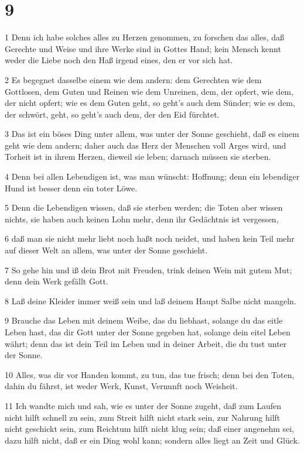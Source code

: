 \chapter{9}

\par 1 Denn ich habe solches alles zu Herzen genommen, zu forschen das alles, daß Gerechte und Weise und ihre Werke sind in Gottes Hand; kein Mensch kennt weder die Liebe noch den Haß irgend eines, den er vor sich hat.
\par 2 Es begegnet dasselbe einem wie dem andern: dem Gerechten wie dem Gottlosen, dem Guten und Reinen wie dem Unreinen, dem, der opfert, wie dem, der nicht opfert; wie es dem Guten geht, so geht's auch dem Sünder; wie es dem, der schwört, geht, so geht's auch dem, der den Eid fürchtet.
\par 3 Das ist ein böses Ding unter allem, was unter der Sonne geschieht, daß es einem geht wie dem andern; daher auch das Herz der Menschen voll Arges wird, und Torheit ist in ihrem Herzen, dieweil sie leben; darnach müssen sie sterben.
\par 4 Denn bei allen Lebendigen ist, was man wünscht: Hoffnung; denn ein lebendiger Hund ist besser denn ein toter Löwe.
\par 5 Denn die Lebendigen wissen, daß sie sterben werden; die Toten aber wissen nichts, sie haben auch keinen Lohn mehr, denn ihr Gedächtnis ist vergessen,
\par 6 daß man sie nicht mehr liebt noch haßt noch neidet, und haben kein Teil mehr auf dieser Welt an allem, was unter der Sonne geschieht.
\par 7 So gehe hin und iß dein Brot mit Freuden, trink deinen Wein mit gutem Mut; denn dein Werk gefällt Gott.
\par 8 Laß deine Kleider immer weiß sein und laß deinem Haupt Salbe nicht mangeln.
\par 9 Brauche das Leben mit deinem Weibe, das du liebhast, solange du das eitle Leben hast, das dir Gott unter der Sonne gegeben hat, solange dein eitel Leben währt; denn das ist dein Teil im Leben und in deiner Arbeit, die du tust unter der Sonne.
\par 10 Alles, was dir vor Handen kommt, zu tun, das tue frisch; denn bei den Toten, dahin du fährst, ist weder Werk, Kunst, Vernunft noch Weisheit.
\par 11 Ich wandte mich und sah, wie es unter der Sonne zugeht, daß zum Laufen nicht hilft schnell zu sein, zum Streit hilft nicht stark sein, zur Nahrung hilft nicht geschickt sein, zum Reichtum hilft nicht klug sein; daß einer angenehm sei, dazu hilft nicht, daß er ein Ding wohl kann; sondern alles liegt an Zeit und Glück.
